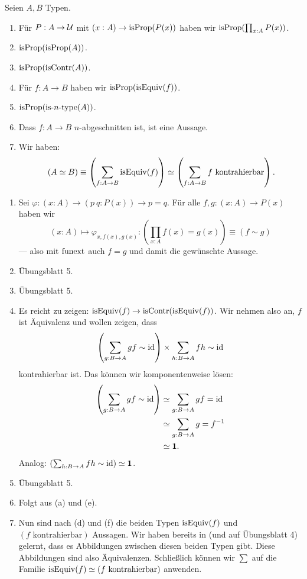 \begin{lemma}
  Seien $A,B$ Typen.
  \begin{enumerate}
  \item Für $P:A\to\mathcal{U}$ mit $(x:A)\to \mathrm{isProp}(P(x))$ haben wir $\mathrm{isProp}(\prod_{x:A}P(x))$.
  \item $\mathrm{isProp}(\mathrm{isProp}(A))$.
  \item $\mathrm{isProp}(\mathrm{isContr}(A))$.
  \item Für $f:A\to B$ haben wir $\mathrm{isProp}(\mathrm{isEquiv}(f))$.
  \item $\mathrm{isProp}(\mathrm{is}\mbox{-}{n}\mbox{-}\mathrm{type}(A))$.
  \item Dass $f:A\to B$ $n$-abgeschnitten ist, ist eine Aussage.
  \item Wir haben:
    \[
      (A\simeq B)\equiv \left(\sum_{f:A\to B}\isEquiv(f)\right)\simeq \left(\sum_{f:A\to B}\text{$f$ kontrahierbar}\right)\rlap{.}
    \]
  \end{enumerate}
\end{lemma}

\begin{beweis}
  \begin{enumerate}
  \item Sei $\varphi:(x:A)\to (p\ q : P(x))\to p=q$. Für alle $f,g:(x:A)\to P(x)$ haben wir
    \[(x:A)\mapsto \varphi_{x,f(x),g(x)} :\left(\prod_{x:A}f(x)= g(x)\right)\equiv (f\sim g)\]
    --- also mit $\mathrm{funext}$ auch $f=g$ und damit die gewünschte Aussage.
  \item Übungsblatt 5.
  \item Übungsblatt 5.
  \item Es reicht zu zeigen: $\mathrm{isEquiv}(f)\to \mathrm{isContr}(\mathrm{isEquiv}(f))$.
    Wir nehmen also an, $f$ ist Äquivalenz und wollen zeigen, dass
    \[
      \left(\sum_{g:B\to A}gf\sim \mathrm{id}\right) \times \sum_{h:B\to A}fh\sim\mathrm{id}
      \]
      kontrahierbar ist. Das können wir komponentenweise lösen:
      \begin{align*}
        \left(\sum_{g:B\to A}gf\sim \id\right)&\simeq\sum_{g:B\to A}gf=\id \\
        &\simeq\sum_{g:B\to A}g=f^{-1} \\
        &\simeq\eins\rlap{.}
      \end{align*}
      Analog: $\left(\sum_{h:B\to A}fh\sim\mathrm{id}\right)\simeq \mathbf{1}$.
    \item Übungsblatt 5.
    \item Folgt aus (a) und (e).
    \item Nun sind nach (d) und (f) die beiden Typen $\mathrm{isEquiv}(f)$ und $(f\text{ kontrahierbar})$ Aussagen. Wir haben bereits in  (und auf Übungsblatt 4) gelernt, dass es Abbildungen zwischen diesen beiden Typen gibt. Diese Abbildungen sind also Äquivalenzen. Schließlich können wir $\sum$ auf die Familie $\mathrm{isEquiv}(f)\simeq(f\text{ kontrahierbar})$ anwenden.
  \end{enumerate}
\end{beweis}

